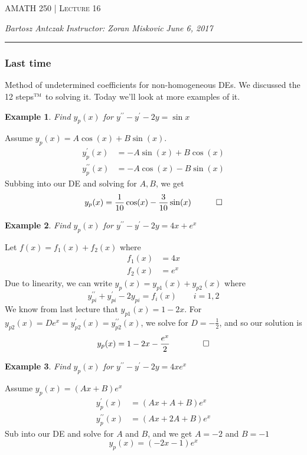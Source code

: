 \documentclass{report}
\newcommand{\lectureNum}{16}
\newcommand{\curDate}{June 6, 2017}
\newcommand{\course}{AMATH 250}
\newcommand{\instructor}{Zoran Miskovic}
\newtheorem{ex}{Example}[section]
\begin{document}
\begin{center}
\begin{Large}
\textsc{\course{} | Lecture \lectureNum{}}
\end{Large}
\end{center} 
\noindent \textit{Bartosz Antczak} \hfill
\textit{Instructor: \instructor{}} \hfill
\textit{\curDate{}}
\rule{\textwidth}{0.4pt}
\subsubsection{Last time}
Method of undetermined coefficients for non-homogeneous DEs. We discussed the 12 steps$^{\textsc{tm}}$ to solving it. Today we'll look at more examples of it.
\begin{ex}
Find $y_p(x)$ for $y^{\prime\prime} - y^\prime - 2y = \sin x$
\end{ex}\noindent
Assume $y_p(x) = A\cos(x) + B\sin(x)$.
\begin{align*}
y_p^\prime (x) &= -A\sin (x) + B\cos(x) \\
y_p^{\prime\prime} (x)&= -A\cos(x) - B\sin(x)
\end{align*}
Subbing into our DE and solving for $A,B$, we get
$$y_p(x)= \frac{1}{10}\cos(x) - \frac{3}{10}\sin(x) \quad \qed$$
\begin{ex}
Find $y_p(x)$ for $y^{\prime\prime} - y^\prime - 2y = 4x + e^x$
\end{ex}\noindent
Let $f(x) = f_1(x) + f_2(x)$ where
\begin{align*}
f_1(x) &= 4x \\
f_2(x) &= e^x
\end{align*}
Due to linearity, we can write $y_p(x) = y_{p1}(x) + y_{p2}(x)$ where
$$y_{pi}^{\prime\prime} + y_{pi}^\prime - 2y_{pi} = f_i(x) \qquad i = 1,2$$
We know from last lecture that $y_{p1}(x) = 1-2x$. For $y_{p2}(x) = De^x = y_{p2}^\prime(x) = y_{p2}^{\prime\prime}(x)$, we solve for $D = -\frac{1}{2}$, and so our solution is
$$y_p(x) = 1-2x - \frac{e^x}{2} \qquad \qed$$
\begin{ex}
Find $y_p(x)$ for $y^{\prime\prime} - y^\prime - 2y = 4xe^x$
\end{ex}\noindent
Assume $y_p(x) = (Ax + B)e^x$
\begin{align*}
y_p^\prime(x) &= (Ax + A + B)e^x \\
y_p^{\prime\prime}(x) &= (Ax + 2A + B)e^x
\end{align*}
Sub into our DE and solve for $A$ and $B$, and we get $A = -2$ and $B = -1$
$$y_p(x) = (-2x-1)e^x$$
\end{document}
